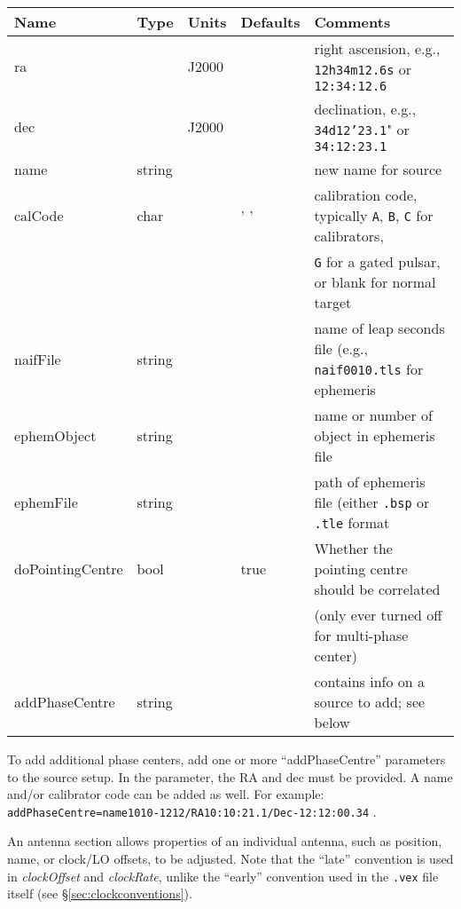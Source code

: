 \begin{center}
\begin{tabular}{l l l l l}
\hline
Name			& Type		& Units & Defaults	& Comments \\
\hline
ra			&		& J2000 &		& right ascension, e.g., {\tt 12h34m12.6s} or {\tt 12:34:12.6} \\
dec			&		& J2000 &		& declination, e.g., {\tt 34d12'23.1}" or {\tt 34:12:23.1} \\
name			& string	&       &		& new name for source \\
calCode			& char		&       & ' '		& calibration code, typically {\tt A}, {\tt B}, {\tt C} for calibrators, \\
			&		&	&		& {\tt G} for a gated pulsar, or blank for normal target \\
naifFile		& string	&       &		& name of leap seconds file (e.g., {\tt naif0010.tls} for ephemeris \\
ephemObject		& string	&       &		& name or number of object in ephemeris file \\
ephemFile		& string	&       &		& path of ephemeris file (either {\tt .bsp} or {\tt .tle} format \\
doPointingCentre	& bool		&	& true		& Whether the pointing centre should be correlated \\
			&		&	&		& (only ever turned off for multi-phase center) \\
addPhaseCentre		& string	&       &		& contains info on a source to add; see below \\
\hline
\hline
\end{tabular}
\end{center}

To add additional phase centers, add one or more ``addPhaseCentre'' parameters to the source setup.
In the parameter, the RA and dec must be provided.
A name and/or calibrator code can be added as well.
For example: {\tt addPhaseCentre=name\@1010-1212/RA\@10:10:21.1/Dec\@-12:12:00.34} .


An antenna section allows properties of an individual antenna, such as position, name, or clock/LO offsets, to be adjusted. 
Note that the ``late'' convention is used in {\em clockOffset} and {\em clockRate}, unlike the ``early'' convention used in the {\tt .vex} file itself (see \S\ref{sec:clockconventions}).

